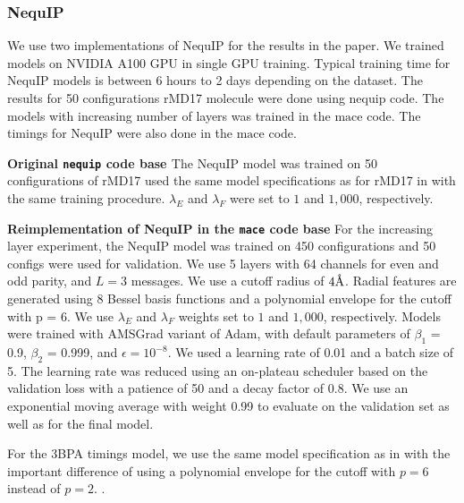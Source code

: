 \documentclass{article}
\newcommand{\angstrom}{\text{\normalfont\AA}}
\newcommand*\compactparagraph[1]{\textbf{#1} \quad}
\begin{document}
\subsubsection{NequIP}
\label{sec:app_nequip}
We use two implementations of NequIP for the results in the paper. We trained models on  NVIDIA A100 GPU in single GPU training. Typical training time for
NequIP models is between 6 hours to 2 days depending on the dataset. The results for 50 configurations rMD17 molecule were done using $\text{nequip}$ code. The models with increasing number of layers was trained in the $\text{mace}$ code. The timings for NequIP were also done in the $\text{mace}$ code.

\compactparagraph{Original \texttt{nequip} code base \cite{nequip}}
The NequIP model was trained on 50 configurations of rMD17 used the same model specifications as for rMD17 in \cite{nequip} with the same training procedure.
$\lambda_{E}$ and $\lambda_{F}$ were set to $1$ and $1,000$, respectively.

\compactparagraph{Reimplementation of NequIP in the \texttt{mace} code base}
For the increasing layer experiment, the NequIP model was trained on 450 configurations and 50 configs were used for validation. We use 5 layers with 64 channels for even and odd parity, and $L=3$ messages. We use a cutoff radius of $4  \angstrom$. Radial features are generated using 8 Bessel basis functions and a
polynomial envelope for the cutoff with p = 6.  We use $\lambda_{E}$ and $\lambda_{F}$ weights set to $1$ and $1,000$, respectively. Models were trained with AMSGrad variant of Adam,
with default parameters of $\beta_{1}$ = 0.9, $\beta_{2}$ = 0.999, and $\epsilon = 10^{-8}$.
We used a learning rate of 0.01 and a batch size of 5.
The learning rate was reduced using an on-plateau scheduler based on the validation loss with a patience of 50 and a decay factor of 0.8.
We use an exponential moving average with weight 0.99 to evaluate on the validation set as well as for the final model.

For the 3BPA timings model, we use the same model specification as in \cite{Allegro2022} with the important difference of using a polynomial envelope for the
cutoff with $p = 6$ instead of $p = 2$. .
\end{document}

